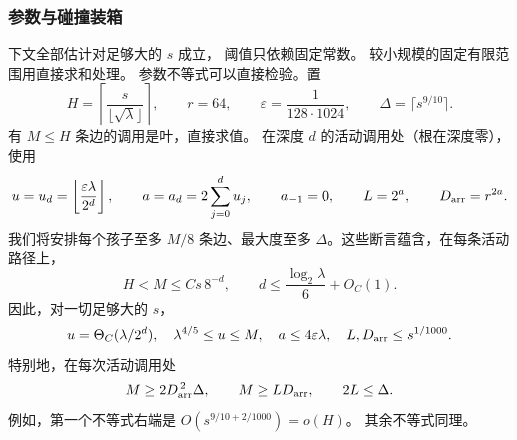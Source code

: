 \subsubsection{参数与碰撞装箱}
\label{subsec:tensor-packing}

下文全部估计对足够大的 $s$ 成立，
阈值只依赖固定常数。
较小规模的固定有限范围用直接求和处理。
参数不等式可以直接检验。置
\[
 H=\left\lceil\frac{s}{\lfloor\sqrt\lambda\rfloor}\right\rceil,
 \qquad r=64,\qquad \varepsilon=\frac1{128\cdot1024},
 \qquad \Delta=\lceil s^{9/10}\rceil.
\]
有 $M\le H$ 条边的调用是叶，直接求值。
在深度 $d$ 的活动调用处（根在深度零），使用
\begin{equation}\label{eq:tensor-parameters}
 u=u_d=\left\lfloor\frac{\varepsilon\lambda}{2^d}\right\rfloor,
 \qquad a=a_d=2\sum_{j=0}^d u_j,\qquad
 a_{-1}=0,\qquad L=2^a,\qquad D_{\rm arr}=r^{2a}.
\end{equation}
我们将安排每个孩子至多 $M/8$ 条边、最大度至多
$\Delta$。这些断言蕴含，在每条活动路径上，
\[
 H<M\le Cs\,8^{-d},\qquad
 d\le\frac{\log_2\lambda}{6}+O_C(1).
\]
因此，对一切足够大的 $s$，
\begin{equation}\label{eq:tensor-parameter-bounds}
 u=\Theta_C(\lambda/2^d),\quad
 \lambda^{4/5}\le u\le M,\quad
 a\le4\varepsilon\lambda,\quad
 L,D_{\rm arr}\le s^{1/1000}.
\end{equation}
特别地，在每次活动调用处
\begin{equation}\label{eq:tensor-packing-conditions}
 M\ge2D_{\rm arr}^{\,2}\Delta,\qquad
 M\ge L D_{\rm arr},\qquad 2L\le\Delta.
\end{equation}
例如，第一个不等式右端是
$O(s^{9/10+2/1000})=o(H)$。
其余不等式同理。

